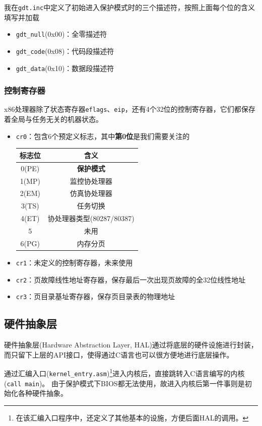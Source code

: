 \documentclass[logo,reportComp]{thesis}
\begin{document}
我在\verb'gdt.inc'中定义了初始进入保护模式时的三个描述符，按照上面每个位的含义填写并加载
\begin{itemize}
	\item \verb'gdt_null'(0x00)：全零描述符
	\item \verb'gdt_code'(0x08)：代码段描述符
	\item \verb'gdt_data'(0x10)：数据段描述符
\end{itemize}

\subsubsection{控制寄存器}
\label{sub:cr}
x86处理器除了状态寄存器\verb'eflags'、\verb'eip'，还有4个32位的控制寄存器，它们都保存着全局与任务无关的机器状态。
\begin{itemize}
	\item \verb'cr0'：包含6个预定义标志，其中\textbf{第0位}是我们需要关注的
	\begin{center}
	\begin{tabular}{|c|c|}\hline
	标志位 & 含义\\\hline
	0(PE) & \textbf{保护模式} \\\hline
	1(MP) & 监控协处理器\\\hline
	2(EM) & 仿真协处理器\\\hline
	3(TS) & 任务切换\\\hline
	4(ET) & 协处理器类型(80287/80387)\\\hline
	5 & 未用\\\hline
	6(PG) & 内存分页\\\hline
	\end{tabular}
	\end{center}
	\item \verb'cr1'：未定义的控制寄存器，未来使用
	\item \verb'cr2'：页故障线性地址寄存器，保存最后一次出现页故障的全32位线性地址
	\item \verb'cr3'：页目录基址寄存器，保存页目录表的物理地址
\end{itemize}

\subsection{硬件抽象层}
硬件抽象层(Hardware Abstraction Layer, HAL)通过将底层的硬件设施进行封装，而只留下上层的API接口，使得通过C语言也可以很方便地进行底层操作。

通过汇编入口(\verb'kernel_entry.asm')\footnote{在该汇编入口程序中，还定义了其他基本的设施，方便后面HAL的调用。}进入内核后，直接跳转入C语言编写的内核(\verb'call main')。
由于保护模式下BIOS都无法使用，故进入内核后第一件事则是初始化各种硬件抽象。
\end{document}
